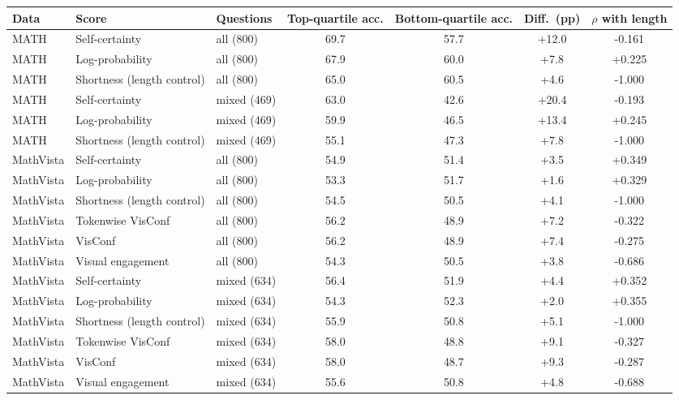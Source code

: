\begin{tabular}{lllcccc}
\toprule
Data & Score & Questions & Top-quartile acc. & Bottom-quartile acc. & Diff.\ (pp) & $\rho$ with length \\
\midrule
MATH & Self-certainty & all (800) & 69.7 & 57.7 & +12.0 & -0.161 \\
MATH & Log-probability & all (800) & 67.9 & 60.0 & +7.8 & +0.225 \\
MATH & Shortness (length control) & all (800) & 65.0 & 60.5 & +4.6 & -1.000 \\
MATH & Self-certainty & mixed (469) & 63.0 & 42.6 & +20.4 & -0.193 \\
MATH & Log-probability & mixed (469) & 59.9 & 46.5 & +13.4 & +0.245 \\
MATH & Shortness (length control) & mixed (469) & 55.1 & 47.3 & +7.8 & -1.000 \\ \midrule
MathVista & Self-certainty & all (800) & 54.9 & 51.4 & +3.5 & +0.349 \\
MathVista & Log-probability & all (800) & 53.3 & 51.7 & +1.6 & +0.329 \\
MathVista & Shortness (length control) & all (800) & 54.5 & 50.5 & +4.1 & -1.000 \\
MathVista & Tokenwise VisConf & all (800) & 56.2 & 48.9 & +7.2 & -0.322 \\
MathVista & VisConf & all (800) & 56.2 & 48.9 & +7.4 & -0.275 \\
MathVista & Visual engagement & all (800) & 54.3 & 50.5 & +3.8 & -0.686 \\
MathVista & Self-certainty & mixed (634) & 56.4 & 51.9 & +4.4 & +0.352 \\
MathVista & Log-probability & mixed (634) & 54.3 & 52.3 & +2.0 & +0.355 \\
MathVista & Shortness (length control) & mixed (634) & 55.9 & 50.8 & +5.1 & -1.000 \\
MathVista & Tokenwise VisConf & mixed (634) & 58.0 & 48.8 & +9.1 & -0.327 \\
MathVista & VisConf & mixed (634) & 58.0 & 48.7 & +9.3 & -0.287 \\
MathVista & Visual engagement & mixed (634) & 55.6 & 50.8 & +4.8 & -0.688 \\
\bottomrule
\end{tabular}